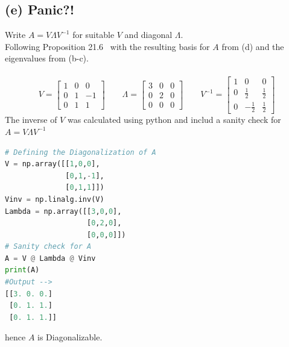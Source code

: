 \documentclass[12pt]{article}
\begin{document}
\subsection*{(e) Panic?!}
Write $A = V \Lambda V^{-1}$ for suitable $V$ and diagonal $\Lambda$.\\
Following Proposition 21.6~\cite{NUMLA} with the resulting basis for $A$ from (d) and the eigenvalues from (b-c).\\\\
\begin{equation*}
    V = \begin{bmatrix}
        1 & 0 & 0 \\
        0 & 1 & -1 \\
        0 & 1 & 1
    \end{bmatrix}
    \qquad 
    \Lambda = \begin{bmatrix}
        3 & 0 & 0 \\
        0 & 2 & 0 \\
        0 & 0 & 0
    \end{bmatrix}
    \qquad V^{-1} =
    \begin{bmatrix}
        1 & 0 & 0 \\
        0 & \frac{1}{2} & \frac{1}{2} \\
        0 & -\frac{1}{2} & \frac{1}{2}
    \end{bmatrix}
\end{equation*}
The inverse of $V$ was calculated using python and includ a sanity check for $A = V \Lambda V^{-1}$
\begin{lstlisting}[language=Python]
# Defining the Diagonalization of A
V = np.array([[1,0,0],
              [0,1,-1],
              [0,1,1]])
Vinv = np.linalg.inv(V)
Lambda = np.array([[3,0,0],
                   [0,2,0],
                   [0,0,0]])
# Sanity check for A
A = V @ Lambda @ Vinv
print(A)
#Output -->
[[3. 0. 0.]
 [0. 1. 1.]
 [0. 1. 1.]]
\end{lstlisting}
hence $A$ is Diagonalizable.
\end{document}
